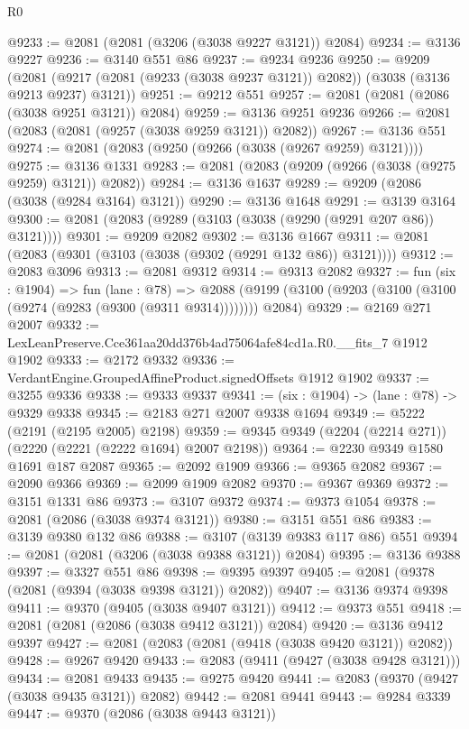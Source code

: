\begin{lexlean}{R0}
\begin{coremodule}
@9233 := @2081 (@2081 (@3206 (@3038 @9227 @3121)) @2084)
@9234 := @3136 @9227
@9236 := @3140 @551 @86
@9237 := @9234 @9236
@9250 := @9209
    (@2081 (@9217 (@2081 (@9233 (@3038 @9237 @3121)) @2082)) (@3038 (@3136 @9213 @9237) @3121))
@9251 := @9212 @551
@9257 := @2081 (@2081 (@2086 (@3038 @9251 @3121)) @2084)
@9259 := @3136 @9251 @9236
@9266 := @2081 (@2083 (@2081 (@9257 (@3038 @9259 @3121)) @2082))
@9267 := @3136 @551
@9274 := @2081 (@2083 (@9250 (@9266 (@3038 (@9267 @9259) @3121))))
@9275 := @3136 @1331
@9283 := @2081 (@2083 (@9209 (@9266 (@3038 (@9275 @9259) @3121)) @2082))
@9284 := @3136 @1637
@9289 := @9209 (@2086 (@3038 (@9284 @3164) @3121))
@9290 := @3136 @1648
@9291 := @3139 @3164
@9300 := @2081 (@2083 (@9289 (@3103 (@3038 (@9290 (@9291 @207 @86)) @3121))))
@9301 := @9209 @2082
@9302 := @3136 @1667
@9311 := @2081 (@2083 (@9301 (@3103 (@3038 (@9302 (@9291 @132 @86)) @3121))))
@9312 := @2083 @3096
@9313 := @2081 @9312
@9314 := @9313 @2082
@9327 := fun (six : @1904) =>
  fun (lane : @78) =>
  @2088 (@9199 (@3100 (@9203 (@3100 (@3100 (@9274 (@9283 (@9300 (@9311 @9314)))))))) @2084)
@9329 := @2169 @271 @2007
@9332 := LexLeanPreserve.Cce361aa20dd376b4ad75064afe84cd1a.R0.__fits_7 @1912 @1902
@9333 := @2172 @9332
@9336 := VerdantEngine.GroupedAffineProduct.signedOffsets @1912 @1902
@9337 := @3255 @9336
@9338 := @9333 @9337
@9341 := (six : @1904) -> (lane : @78) -> @9329 @9338
@9345 := @2183 @271 @2007 @9338 @1694
@9349 := @5222 (@2191 (@2195 @2005) @2198)
@9359 := @9345 @9349 (@2204 (@2214 @271)) (@2220 (@2221 (@2222 @1694) @2007 @2198))
@9364 := @2230 @9349 @1580 @1691 @187 @2087
@9365 := @2092 @1909
@9366 := @9365 @2082
@9367 := @2090 @9366
@9369 := @2099 @1909 @2082
@9370 := @9367 @9369
@9372 := @3151 @1331 @86
@9373 := @3107 @9372
@9374 := @9373 @1054
@9378 := @2081 (@2086 (@3038 @9374 @3121))
@9380 := @3151 @551 @86
@9383 := @3139 @9380 @132 @86
@9388 := @3107 (@3139 @9383 @117 @86) @551
@9394 := @2081 (@2081 (@3206 (@3038 @9388 @3121)) @2084)
@9395 := @3136 @9388
@9397 := @3327 @551 @86
@9398 := @9395 @9397
@9405 := @2081 (@9378 (@2081 (@9394 (@3038 @9398 @3121)) @2082))
@9407 := @3136 @9374 @9398
@9411 := @9370 (@9405 (@3038 @9407 @3121))
@9412 := @9373 @551
@9418 := @2081 (@2081 (@2086 (@3038 @9412 @3121)) @2084)
@9420 := @3136 @9412 @9397
@9427 := @2081 (@2083 (@2081 (@9418 (@3038 @9420 @3121)) @2082))
@9428 := @9267 @9420
@9433 := @2083 (@9411 (@9427 (@3038 @9428 @3121)))
@9434 := @2081 @9433
@9435 := @9275 @9420
@9441 := @2083 (@9370 (@9427 (@3038 @9435 @3121)) @2082)
@9442 := @2081 @9441
@9443 := @9284 @3339
@9447 := @9370 (@2086 (@3038 @9443 @3121))

\end{coremodule}
\end{lexlean}
